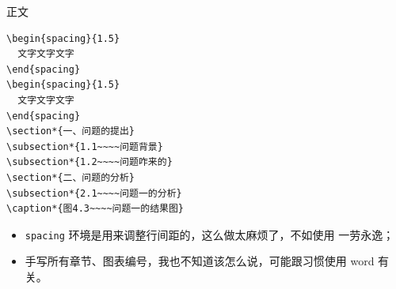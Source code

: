 \documentclass[aspectratio=169,fontset=none]{ctexbeamer}
\begin{document}
  \begin{frame}[fragile]{正文}
    \begin{minipage}[t]{0.5\textwidth}
      \begin{verbatim}
\begin{spacing}{1.5}
  文字文字文字
\end{spacing}
\begin{spacing}{1.5}
  文字文字文字
\end{spacing}
\section*{一、问题的提出}
\subsection*{1.1~~~~问题背景}
\subsection*{1.2~~~~问题咋来的}
\section*{二、问题的分析}
\subsection*{2.1~~~~问题一的分析}
\caption*{图4.3~~~~问题一的结果图}
      \end{verbatim}
    \end{minipage}%
    \begin{minipage}[t]{0.5\textwidth}
      \begin{itemize}
        \item \texttt{spacing} 环境是用来调整行间距的，这么做太麻烦了，不如使用 \texttt{\linespread} 一劳永逸；
        \item 手写所有章节、图表编号，我也不知道该怎么说，可能跟习惯使用 word 有关。
      \end{itemize}
    \end{minipage}
  \end{frame}
\end{document}
